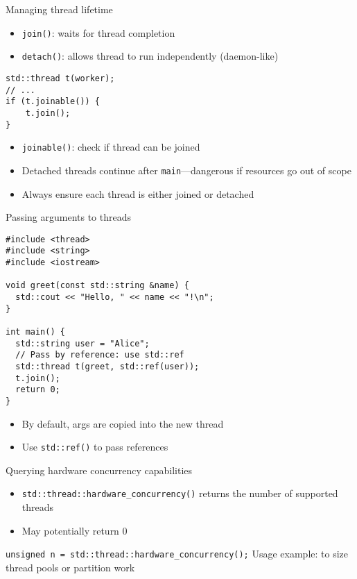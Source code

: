 \documentclass{beamer}
\begin{document}
\begin{frame}[fragile]{Managing thread lifetime}
  \begin{itemize}
    \item \texttt{join()}: waits for thread completion
    \item \texttt{detach()}: allows thread to run independently (daemon-like)
  \end{itemize}
  \lstset{style=CStyle}
  \begin{lstlisting}
std::thread t(worker);
// ...
if (t.joinable()) {
    t.join();
}
  \end{lstlisting}
  \begin{itemize}
    \item \texttt{joinable()}: check if thread can be joined
  \end{itemize}
  \begin{itemize}
    \item Detached threads continue after \texttt{main}—dangerous if resources go out of scope
    \item Always ensure each thread is either joined or detached
  \end{itemize}
\end{frame}

\begin{frame}[fragile]{Passing arguments to threads}
  \lstset{style=CStyle}
  \begin{lstlisting}
#include <thread>
#include <string>
#include <iostream>

void greet(const std::string &name) {
  std::cout << "Hello, " << name << "!\n";
}

int main() {
  std::string user = "Alice";
  // Pass by reference: use std::ref
  std::thread t(greet, std::ref(user));
  t.join();
  return 0;
}
  \end{lstlisting}
  \begin{itemize}
    \item By default, args are copied into the new thread
    \item Use \texttt{std::ref()} to pass references
  \end{itemize}
\end{frame}

\begin{frame}{Querying hardware concurrency capabilities}
  \begin{itemize}
    \item \texttt{std::thread::hardware\_concurrency()} returns the number of supported threads
    \item May potentially return 0
  \end{itemize}
  \texttt{unsigned n = std::thread::hardware\_concurrency();}
  Usage example: to size thread pools or partition work
\end{frame}
\end{document}
